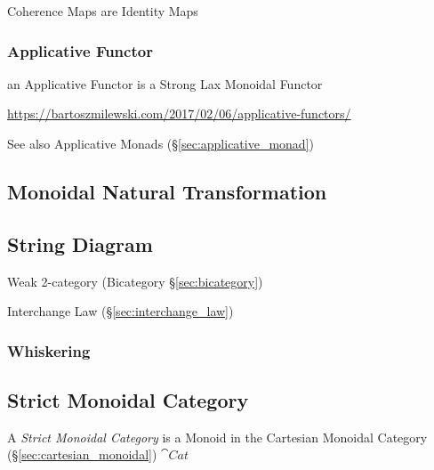 Coherence Maps are Identity Maps



\subsubsection{Applicative Functor}\label{sec:applicative_functor}

an Applicative Functor is a Strong Lax Monoidal Functor

\url{https://bartoszmilewski.com/2017/02/06/applicative-functors/}

\fist See also Applicative Monads (\S\ref{sec:applicative_monad})



\subsection{Monoidal Natural Transformation}
\label{sec:monoidal_natural_transformation}

\subsection{String Diagram}\label{sec:string_diagram}

Weak 2-category (Bicategory \S\ref{sec:bicategory})

Interchange Law (\S\ref{sec:interchange_law})



\subsubsection{Whiskering}\label{sec:whiskering}



\subsection{Strict Monoidal Category}\label{sec:strict_monoidal}

A \emph{Strict Monoidal Category} is a Monoid in the Cartesian
Monoidal Category (\S\ref{sec:cartesian_monoidal}) $\cat{Cat}$

